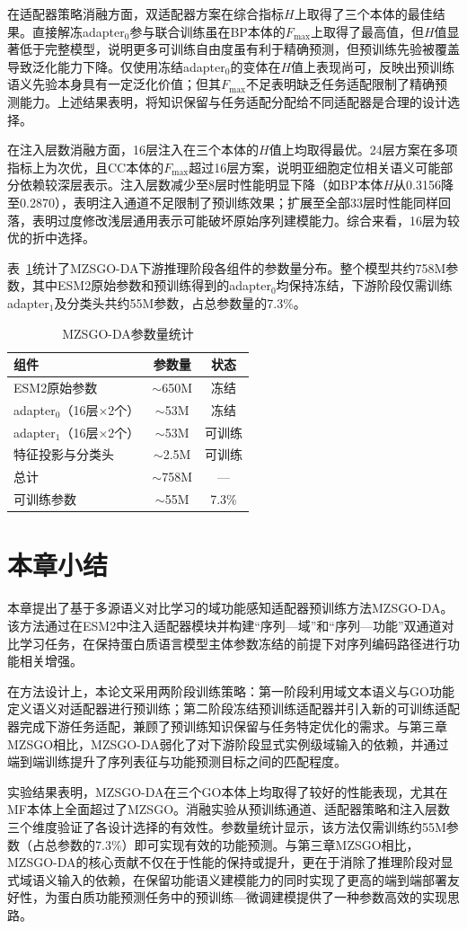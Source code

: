 在适配器策略消融方面，双适配器方案在综合指标$H$上取得了三个本体的最佳结果。直接解冻adapter$_0$参与联合训练虽在BP本体的$F_{\max}$上取得了最高值，但$H$值显著低于完整模型，说明更多可训练自由度虽有利于精确预测，但预训练先验被覆盖导致泛化能力下降。仅使用冻结adapter$_0$的变体在$H$值上表现尚可，反映出预训练语义先验本身具有一定泛化价值；但其$F_{\max}$不足表明缺乏任务适配限制了精确预测能力。上述结果表明，将知识保留与任务适配分配给不同适配器是合理的设计选择。

在注入层数消融方面，16层注入在三个本体的$H$值上均取得最优。24层方案在多项指标上为次优，且CC本体的$F_{\max}$超过16层方案，说明亚细胞定位相关语义可能部分依赖较深层表示。注入层数减少至8层时性能明显下降（如BP本体$H$从0.3156降至0.2870），表明注入通道不足限制了预训练效果；扩展至全部33层时性能同样回落，表明过度修改浅层通用表示可能破坏原始序列建模能力。综合来看，16层为较优的折中选择。

表~\ref{tab:mzsgo_da_params}统计了MZSGO-DA下游推理阶段各组件的参数量分布。整个模型共约758M参数，其中ESM2原始参数和预训练得到的adapter$_0$均保持冻结，下游阶段仅需训练adapter$_1$及分类头共约55M参数，占总参数量的7.3\%。

\begin{table}[htbp]
\centering
\caption{MZSGO-DA参数量统计}
\label{tab:mzsgo_da_params}
\small
\begin{tabular}{lcc}
\toprule
组件 & 参数量 & 状态 \\
\midrule
ESM2原始参数 & $\sim$650M & 冻结 \\
adapter$_0$（16层$\times$2个） & $\sim$53M & 冻结 \\
adapter$_1$（16层$\times$2个） & $\sim$53M & 可训练 \\
特征投影与分类头 & $\sim$2.5M & 可训练 \\
总计 & $\sim$758M & — \\
可训练参数 & $\sim$55M & 7.3\% \\
\bottomrule
\end{tabular}
\end{table}

\section{本章小结}

本章提出了基于多源语义对比学习的域功能感知适配器预训练方法MZSGO-DA。该方法通过在ESM2中注入适配器模块并构建“序列—域”和“序列—功能”双通道对比学习任务，在保持蛋白质语言模型主体参数冻结的前提下对序列编码路径进行功能相关增强。

在方法设计上，本论文采用两阶段训练策略：第一阶段利用域文本语义与GO功能定义语义对适配器进行预训练；第二阶段冻结预训练适配器并引入新的可训练适配器完成下游任务适配，兼顾了预训练知识保留与任务特定优化的需求。与第三章MZSGO相比，MZSGO-DA弱化了对下游阶段显式实例级域输入的依赖，并通过端到端训练提升了序列表征与功能预测目标之间的匹配程度。

实验结果表明，MZSGO-DA在三个GO本体上均取得了较好的性能表现，尤其在MF本体上全面超过了MZSGO。消融实验从预训练通道、适配器策略和注入层数三个维度验证了各设计选择的有效性。参数量统计显示，该方法仅需训练约55M参数（占总参数的7.3\%）即可实现有效的功能预测。与第三章MZSGO相比，MZSGO-DA的核心贡献不仅在于性能的保持或提升，更在于消除了推理阶段对显式域语义输入的依赖，在保留功能语义建模能力的同时实现了更高的端到端部署友好性，为蛋白质功能预测任务中的预训练—微调建模提供了一种参数高效的实现思路。